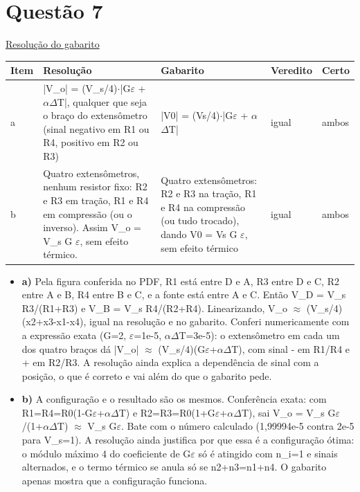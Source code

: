 \documentclass{article}%
\begin{document}
\section*{Questão 7}%
\href{https://poliedroresolve.sistemapoliedro.com.br/vestibulares/ita/2027/ita-2-fase-dia-3-22-10-2026-2-fase-dia-3/dissertativa-7-fisica-2-fase-dia-3-ita-2027}{Resolução do gabarito}\par\smallskip%
\begin{longtable}{@{}p{} p{} p{} p{} p{}@{}}\toprule Item & Resolução & Gabarito & Veredito & Certo \\ \midrule
a & |V\_o| = (V\_s/4)$\cdot$|G$\varepsilon$ + $\alpha$$\Delta$T|, qualquer que seja o braço do extensômetro (sinal negativo em R1 ou R4, positivo em R2 ou R3) & |V0| = (Vs/4)$\cdot$|G$\varepsilon$ + $\alpha$$\Delta$T| & igual & ambos \\
b & Quatro extensômetros, nenhum resistor fixo: R2 e R3 em tração, R1 e R4 em compressão (ou o inverso). Assim V\_o = V\_s G $\varepsilon$, sem efeito térmico. & Quatro extensômetros: R2 e R3 na tração, R1 e R4 na compressão (ou tudo trocado), dando V0 = Vs G $\varepsilon$, sem efeito térmico & igual & ambos \\
\bottomrule\end{longtable}%
\begin{itemize}%
\item%
\textbf{a)} Pela figura conferida no PDF, R1 está entre D e A, R3 entre D e C, R2 entre A e B, R4 entre B e C, e a fonte está entre A e C. Então V\_D = V\_s R3/(R1+R3) e V\_B = V\_s R4/(R2+R4). Linearizando, V\_o $\approx$ (V\_s/4)(x2+x3-x1-x4), igual na resolução e no gabarito. Conferi numericamente com a expressão exata (G=2, $\varepsilon$=1e{-}5, $\alpha$$\Delta$T=3e{-}5): o extensômetro em cada um dos quatro braços dá |V\_o| $\approx$ (V\_s/4)(G$\varepsilon$+$\alpha$$\Delta$T), com sinal - em R1/R4 e + em R2/R3. A resolução ainda explica a dependência de sinal com a posição, o que é correto e vai além do que o gabarito pede.%
\item%
\textbf{b)} A configuração e o resultado são os mesmos. Conferência exata: com R1=R4=R0(1-G$\varepsilon$+$\alpha$$\Delta$T) e R2=R3=R0(1+G$\varepsilon$+$\alpha$$\Delta$T), sai V\_o = V\_s G$\varepsilon$/(1+$\alpha$$\Delta$T) $\approx$ V\_s G$\varepsilon$. Bate com o número calculado (1,99994e{-}5 contra 2e{-}5 para V\_s=1). A resolução ainda justifica por que essa é a configuração ótima: o módulo máximo 4 do coeficiente de G$\varepsilon$ só é atingido com n\_i=1 e sinais alternados, e o termo térmico se anula só se n2+n3=n1+n4. O gabarito apenas mostra que a configuração funciona.%
\end{itemize}%
\end{document}
